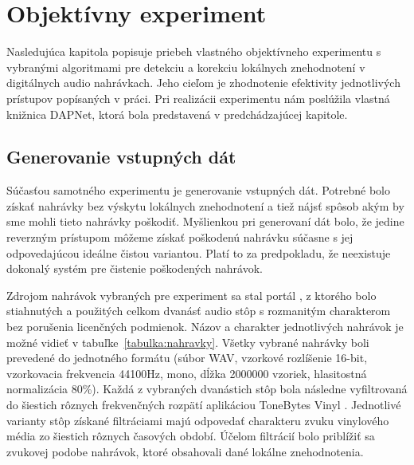 
\chapter{Objektívny experiment}
Nasledujúca kapitola popisuje priebeh vlastného objektívneho experimentu s vybranými algoritmami pre detekciu a korekciu lokálnych znehodnotení v digitálnych audio nahrávkach. Jeho cieľom je zhodnotenie efektivity jednotlivých prístupov popísaných v práci. Pri realizácii experimentu nám poslúžila vlastná knižnica DAPNet, ktorá bola predstavená v predchádzajúcej kapitole.

\section{Generovanie vstupných dát}
Súčasťou samotného experimentu je generovanie vstupných dát. Potrebné bolo získať nahrávky bez výskytu lokálnych znehodnotení a tiež nájsť spôsob akým by sme mohli tieto nahrávky poškodiť. Myšlienkou pri generovaní dát bolo, že jedine reverzným prístupom môžeme získať poškodenú nahrávku súčasne s jej odpovedajúcou ideálne čistou variantou. Platí to za predpokladu, že neexistuje dokonalý systém pre čistenie poškodených nahrávok. 

Zdrojom nahrávok vybraných pre experiment sa stal portál \cite{Freesound}, z ktorého bolo stiahnutých a použitých celkom dvanásť audio stôp s rozmanitým charakterom bez porušenia licenčných podmienok. Názov a charakter jednotlivých nahrávok je možné vidieť v tabuľke~\ref{tabulka:nahravky}. Všetky vybrané nahrávky boli prevedené do jednotného formátu (súbor WAV, vzorkové rozlíšenie 16-bit, vzorkovacia frekvencia 44100Hz, mono, dĺžka 2000000 vzoriek, hlasitostná normalizácia 80\%). Každá z vybraných dvanástich stôp bola následne vyfiltrovaná do šiestich rôznych frekvenčných rozpätí aplikáciou ToneBytes Vinyl \cite{Vinyl}. Jednotlivé varianty stôp získané filtráciami majú odpovedať charakteru zvuku vinylového média zo šiestich rôznych časových období. Účelom filtrácií bolo priblížiť sa zvukovej podobe nahrávok, ktoré obsahovali dané lokálne znehodnotenia. 

